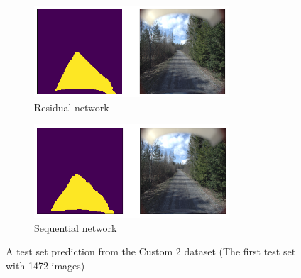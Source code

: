 \documentclass[USenglish]{ifimaster}  %
\begin{document}
\begin{figure}[ht]
\centering
\begin{subfigure}[b]{\textwidth}
\centering
\includegraphics[width=0.8\textwidth]{bilder/custom_2/474_res.png}
\caption{Residual network}
\label{fig:custom_2_res}
\end{subfigure}
\hfill
\begin{subfigure}[b]{\textwidth}
\centering
\includegraphics[width=0.8\textwidth]{bilder/custom_2/474_seq.png}
\caption{Sequential network}
\label{fig:custom_2_seq}
\end{subfigure}
\caption{A test set prediction from the Custom 2 dataset (The first test set with 1472 images)}
\end{figure}
\end{document}
